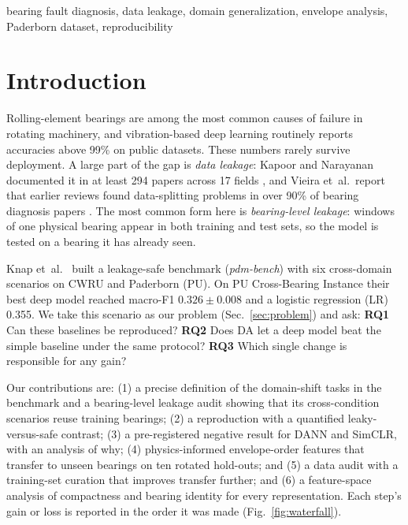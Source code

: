 \documentclass[conference]{IEEEtran}
\newcommand{\mF}{macro-F1}
\begin{document}
\begin{IEEEkeywords}
bearing fault diagnosis, data leakage, domain generalization, envelope analysis, Paderborn dataset, reproducibility
\end{IEEEkeywords}

\section{Introduction}
Rolling-element bearings are among the most common causes of failure in rotating machinery,
and vibration-based deep learning routinely reports accuracies above 99\% on public datasets.
These numbers rarely survive deployment. A large part of the gap is \emph{data leakage}:
Kapoor and Narayanan documented it in at least 294 papers across 17 fields \cite{kapoor2023},
and Vieira et~al.\ report that earlier reviews found data-splitting problems in over 90\% of
bearing diagnosis papers \cite{vieira2026}. The most common form here is \emph{bearing-level
leakage}: windows of one physical bearing appear in both training and test sets, so the model
is tested on a bearing it has already seen.

Knap et~al.\ \cite{knap2026} built a leakage-safe benchmark (\textit{pdm-bench}) with six
cross-domain scenarios on CWRU and Paderborn (PU). On PU Cross-Bearing Instance their best deep
model reached \mF{} $0.326\pm0.008$ and a logistic regression (LR) 0.355. We take this
scenario as our problem (Sec.~\ref{sec:problem}) and ask:
\textbf{RQ1} Can these baselines be reproduced?
\textbf{RQ2} Does DA let a deep model beat the simple baseline under the same protocol?
\textbf{RQ3} Which single change is responsible for any gain?

Our contributions are: (1) a precise definition of the domain-shift tasks in the benchmark and a
bearing-level leakage audit showing that its cross-condition scenarios reuse training bearings;
(2) a reproduction with a quantified leaky-versus-safe contrast; (3) a pre-registered negative
result for DANN and SimCLR, with an analysis of why; (4) physics-informed envelope-order
features that transfer to unseen bearings on ten rotated hold-outs; and (5) a data audit with a
training-set curation that improves transfer further; and (6) a feature-space analysis of
compactness and bearing identity for every representation. Each step's gain or loss is reported in
the order it was made (Fig.~\ref{fig:waterfall}).
\end{document}
